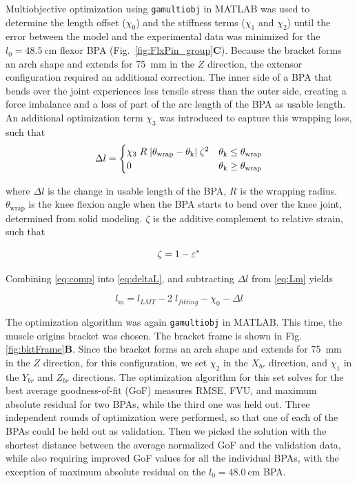 Multiobjective optimization using \texttt{gamultiobj} in MATLAB was used to determine the length offset ($\chi_{0}$) and the stiffness terms ($\chi_{1}$ and $\chi_{2}$) until the error between the model and the experimental data was minimized for the $l_{0}=\qty{48.5}{\cm}$ flexor BPA (Fig.~\ref{fig:FlxPin_group}\textbf{C}). Because the bracket forms an arch shape and extends for \qty{75}{\mm} in the $Z$ direction, the extensor configuration required an additional correction. The inner side of a BPA that bends over the joint experiences less tensile stress than the outer side, creating a force imbalance and a loss of part of the arc length of the BPA as usable length. An additional optimization term $\chi_{3}$ was introduced to capture this wrapping loss, such that
\begin{equation}
    \Delta l = \begin{cases}
     \chi_{3}\;R\;\lvert \theta_\text{wrap}-\theta_\text{k}\rvert\;\zeta^2 & \theta_\text{k} \leq      \theta_\text{wrap} \\
      0 & \theta_\text{k} \geq \theta_\text{wrap}
     \end{cases}\label{eq:deltaL}
\end{equation}

where $\Delta l$ is the change in usable length of the BPA, $R$ is the wrapping radius. $\theta_\text{wrap}$ is the knee flexion angle when the BPA starts to bend over the knee joint, determined from solid modeling. $\zeta$ is the additive complement to relative strain, such that

\begin{equation}
    \zeta = 1-\varepsilon^*  \\
\label{eq:comp}
\end{equation}

Combining \eqref{eq:comp} into \eqref{eq:deltaL}, and subtracting $\Delta l$ from  \eqref{eq:Lm} yields

\begin{equation}
    l_\text{m} = l_{LMT} - 2\;l_{fitting}  - \chi_{0} - \Delta l\label{eq:x3}
\end{equation}

The optimization algorithm was again \texttt{gamultiobj} in MATLAB. This time, the muscle origins bracket was chosen. The bracket frame is shown in Fig. \ref{fig:bktFrame}\textbf{B}. Since the bracket forms an arch shape and extends for \qty{75}{\mm} in the $Z$ direction, for this configuration, we set $\chi_{2}$ in the $X_{br}$ direction, and $\chi_{1}$ in the $Y_{br}$ and $Z_{br}$ directions. The optimization algorithm for this set solves for the best average goodness-of-fit (GoF) measures RMSE, FVU, and maximum absolute residual for two BPAs, while the third one was held out. Three independent rounds of optimization were performed, so that one of each of the BPAs could be held out as validation. Then we picked the solution with the shortest distance between the average normalized GoF and the validation data, while also requiring improved GoF values for all the individual BPAs, with the exception of maximum absolute residual on the $l_{0}=\qty{48.0}{\cm}$ BPA.

